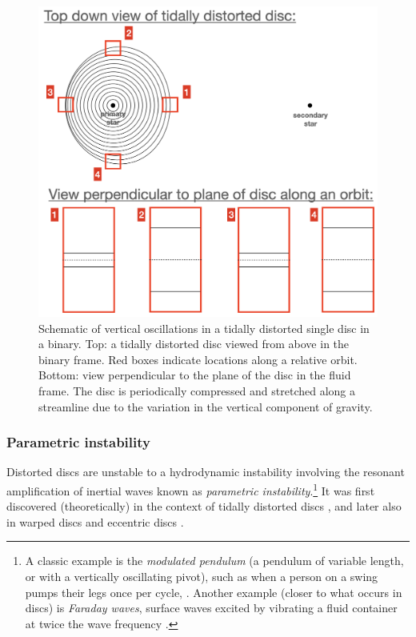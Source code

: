 \documentclass[fleqn,usenatbib]{mnras}
\begin{document}
\begin{figure}
\centering
\includegraphics[scale=0.3]{Figures/VerticalOscillationsSchematic2.png}
\caption{Schematic of vertical oscillations in a tidally distorted single disc in a binary. Top: a tidally distorted disc viewed from above in the binary frame. Red boxes indicate locations along a relative orbit. Bottom: view perpendicular to the plane of the disc in the fluid frame. The disc is periodically compressed and stretched along a streamline due to the variation in the vertical component of gravity.}
\label{FIGURE_VerticalOscillationsSchematic}
\end{figure}

\subsubsection{Parametric instability}
Distorted discs are unstable to a hydrodynamic instability involving the resonant amplification of inertial waves known as \textit{parametric instability}.\footnote{A classic example is the \textit{modulated pendulum} (a pendulum of variable length, or with a vertically oscillating pivot), such as when a person on a swing pumps their legs once per cycle, \citep{landau1960mechanics}. Another example (closer to what occurs in discs) is \textit{Faraday waves}, surface waves excited by vibrating a fluid container at twice the wave frequency \citep{miles1990parametrically}.} It was first discovered (theoretically) in the context of tidally distorted discs \citep{goodman1993local,1993ApJ...419..758L,ryu1994nonlinear}, and later also in warped discs \citep{papaloizou1995dynamics, gammie2000linear,ogilvie2013local} and eccentric discs \citep{papaloizou2005local, papaloizou2005global, barker2014hydrodynamic,ogilvie2014local,wienkers2018non}.
\end{document}
